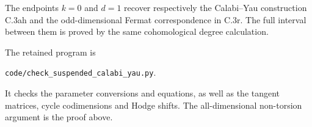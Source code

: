The endpoints $k=0$ and $d=1$ recover respectively the
Calabi--Yau construction C.3ah and the odd-dimensional
Fermat correspondence in C.3r. The full interval between
them is proved by the same cohomological degree calculation.

The retained program is
\begin{center}
\texttt{code/check\_suspended\_calabi\_yau.py}.
\end{center}
It checks the parameter conversions and equations, as well as the
tangent matrices, cycle codimensions and Hodge shifts.
The all-dimensional non-torsion argument is the proof above.
